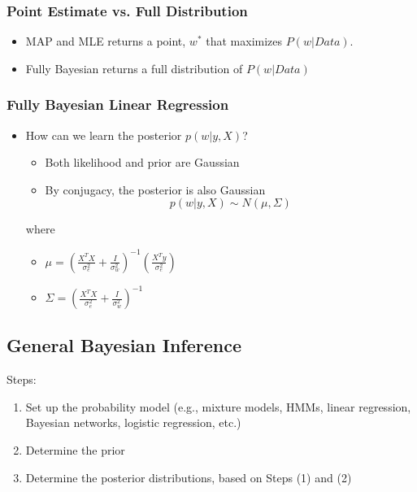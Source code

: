 \documentclass[10pt]{article}
\begin{document}
\subsubsection*{Point Estimate vs. Full Distribution}
\begin{itemize}
	\item MAP and MLE returns a point, $w^*$ that maximizes $P(w | Data)$.
	\item Fully Bayesian returns a full distribution of $P(w | Data)$
\end{itemize}

\subsubsection*{Fully Bayesian Linear Regression}
\begin{itemize}
	\item How can we learn the posterior $p(w | y, X)$?
	\begin{itemize}
	    \item Both likelihood and prior are Gaussian
	    \item By conjugacy, the posterior is also Gaussian
	    \[p(w | y, X) \sim N(\mu, \Sigma)\]
    \end{itemize}
    where
    \begin{itemize}
	    \item $\mu = \left(\frac{X^T X}{\sigma_e^2} + \frac{I}{\sigma_w^2}\right)^{-1} \left(\frac{X^T y}{\sigma_e^2}\right)$
	    \item $\Sigma = \left(\frac{X^T X}{\sigma_e^2} + \frac{I}{\sigma_w^2}\right)^{-1}$
    \end{itemize}
\end{itemize}

\subsection*{General Bayesian Inference}
Steps:
\begin{enumerate}
	\item Set up the probability model (e.g., mixture models, HMMs, linear regression, Bayesian networks, logistic regression, etc.)
	\item Determine the prior
	\item Determine the posterior distributions, based on Steps (1) and (2)
\end{enumerate}
\end{document}
